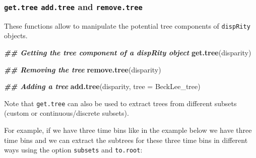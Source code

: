 \documentclass[
]{book}
\newenvironment{Shaded}{\begin{snugshade}}{\end{snugshade}}
\newcommand{\AttributeTok}[1]{\textcolor[rgb]{0.13,0.29,0.53}{#1}}
\newcommand{\DocumentationTok}[1]{\textcolor[rgb]{0.56,0.35,0.01}{\textbf{\textit{#1}}}}
\newcommand{\FunctionTok}[1]{\textcolor[rgb]{0.13,0.29,0.53}{\textbf{#1}}}
\newcommand{\NormalTok}[1]{#1}
\begin{document}
\hypertarget{get.tree-add.tree-and-remove.tree}{%
\subsubsection{\texorpdfstring{\texttt{get.tree} \texttt{add.tree} and \texttt{remove.tree}}{get.tree add.tree and remove.tree}}\label{get.tree-add.tree-and-remove.tree}}

These functions allow to manipulate the potential tree components of \texttt{dispRity} objects.

\begin{Shaded}
\begin{Highlighting}[]
\DocumentationTok{\#\# Getting the tree component of a dispRity object}
\FunctionTok{get.tree}\NormalTok{(disparity)}

\DocumentationTok{\#\# Removing the tree}
\FunctionTok{remove.tree}\NormalTok{(disparity)}

\DocumentationTok{\#\# Adding a tree}
\FunctionTok{add.tree}\NormalTok{(disparity, }\AttributeTok{tree =}\NormalTok{ BeckLee\_tree)}
\end{Highlighting}
\end{Shaded}

Note that \texttt{get.tree} can also be used to extract trees from different subsets (custom or continuous/discrete subsets).

For example, if we have three time bins like in the example below we have three time bins and we can extract the subtrees for these three time bins in different ways using the option \texttt{subsets} and \texttt{to.root}:
\end{document}
